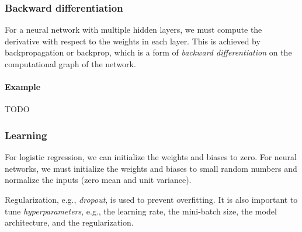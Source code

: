 \subsubsection{Backward differentiation}
\label{sec:7:backward-differentiation}

For a neural network with multiple hidden layers, we must compute the derivative
with respect to the weights in each layer.
This is achieved by backpropagation or backprop, which is a form of
\textit{backward differentiation} on the computational graph of the network.

\paragraph{Example} TODO

\subsubsection{Learning}

For logistic regression, we can initialize the weights and biases to zero.
For neural networks, we must initialize the weights and biases to small random
numbers and normalize the inputs (zero mean and unit variance).

Regularization, e.g., \textit{dropout}, is used to prevent overfitting.
It is also important to tune \textit{hyperparameters}, e.g., the learning rate,
the mini-batch size, the model architecture, and the regularization.


